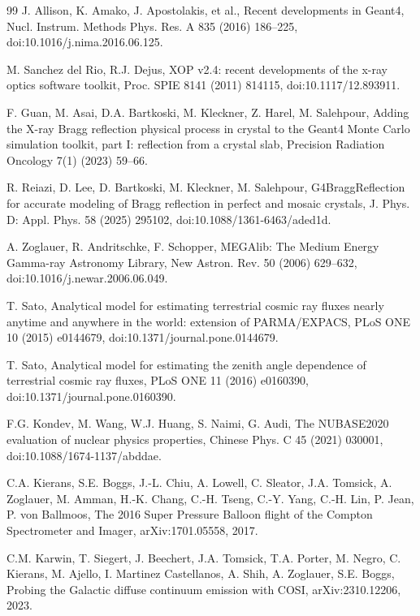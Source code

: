 \documentclass[11pt]{article}
\begin{document}
\begin{thebibliography}{99}
J. Allison, K. Amako, J. Apostolakis, et al., Recent developments in Geant4, Nucl. Instrum. Methods Phys. Res. A 835 (2016) 186--225, doi:10.1016/j.nima.2016.06.125.

M. Sanchez del Rio, R.J. Dejus, XOP v2.4: recent developments of the x-ray optics software toolkit, Proc. SPIE 8141 (2011) 814115, doi:10.1117/12.893911.

F. Guan, M. Asai, D.A. Bartkoski, M. Kleckner, Z. Harel, M. Salehpour, Adding the X-ray Bragg reflection physical process in crystal to the Geant4 Monte Carlo simulation toolkit, part I: reflection from a crystal slab, Precision Radiation Oncology 7(1) (2023) 59--66.

R. Reiazi, D. Lee, D. Bartkoski, M. Kleckner, M. Salehpour, G4BraggReflection for accurate modeling of Bragg reflection in perfect and mosaic crystals, J. Phys. D: Appl. Phys. 58 (2025) 295102, doi:10.1088/1361-6463/aded1d.

A. Zoglauer, R. Andritschke, F. Schopper, MEGAlib: The Medium Energy Gamma-ray Astronomy Library, New Astron. Rev. 50 (2006) 629--632, doi:10.1016/j.newar.2006.06.049.

T. Sato, Analytical model for estimating terrestrial cosmic ray fluxes nearly anytime and anywhere in the world: extension of PARMA/EXPACS, PLoS ONE 10 (2015) e0144679, doi:10.1371/journal.pone.0144679.

T. Sato, Analytical model for estimating the zenith angle dependence of terrestrial cosmic ray fluxes, PLoS ONE 11 (2016) e0160390, doi:10.1371/journal.pone.0160390.

F.G. Kondev, M. Wang, W.J. Huang, S. Naimi, G. Audi, The NUBASE2020 evaluation of nuclear physics properties, Chinese Phys. C 45 (2021) 030001, doi:10.1088/1674-1137/abddae.

C.A. Kierans, S.E. Boggs, J.-L. Chiu, A. Lowell, C. Sleator, J.A. Tomsick, A. Zoglauer, M. Amman, H.-K. Chang, C.-H. Tseng, C.-Y. Yang, C.-H. Lin, P. Jean, P. von Ballmoos, The 2016 Super Pressure Balloon flight of the Compton Spectrometer and Imager, arXiv:1701.05558, 2017.

C.M. Karwin, T. Siegert, J. Beechert, J.A. Tomsick, T.A. Porter, M. Negro, C. Kierans, M. Ajello, I. Martinez Castellanos, A. Shih, A. Zoglauer, S.E. Boggs, Probing the Galactic diffuse continuum emission with COSI, arXiv:2310.12206, 2023.


\end{thebibliography}
\end{document}
